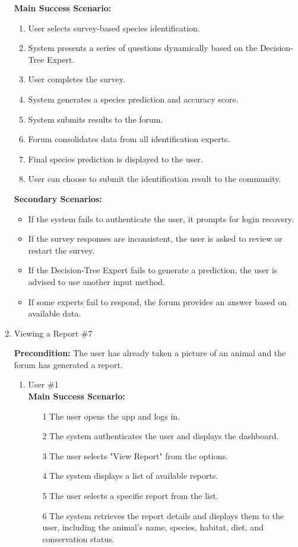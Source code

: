 \documentclass[]{article}
\begin{document}
\begin{enumerate}[{\bf BE1.}]
\textbf{Main Success Scenario:}
\begin{enumerate}
    \item User selects survey-based species identification.
    \item System presents a series of questions dynamically based on the Decision-Tree Expert.
    \item User completes the survey.
    \item System generates a species prediction and accuracy score.
    \item System submits results to the forum.
    \item Forum consolidates data from all identification experts.
    \item Final species prediction is displayed to the user.
    \item User can choose to submit the identification result to the community.
\end{enumerate}

\textbf{Secondary Scenarios:}
\begin{itemize}
    \item If the system fails to authenticate the user, it prompts for login recovery.
    \item If the survey responses are inconsistent, the user is asked to review or restart the survey.
    \item If the Decision-Tree Expert fails to generate a prediction, the user is advised to use another input method.
    \item If some experts fail to respond, the forum provides an answer based on available data.
\end{itemize}

\item Viewing a Report \#7

    \textbf{Precondition:} The user has already taken a picture of an animal and the forum has generated a report.

    \begin{enumerate}[{\bf VP1.}]
        \item User \#1 \\

            \textbf{Main Success Scenario:}
            \begin{enumerate}
                \item[1] The user opens the app and logs in.
                \item[2] The system authenticates the user and displays the dashboard.
                \item[3] The user selects "View Report" from the options.
                \item[4] The system displays a list of available reports.
                \item[5] The user selects a specific report from the list.
                \item[6] The system retrieves the report details and displays them to the user, including the animal's name, species, habitat, diet, and conservation status.
            \end{enumerate}


\end{enumerate}
\end{enumerate}
\end{document}
